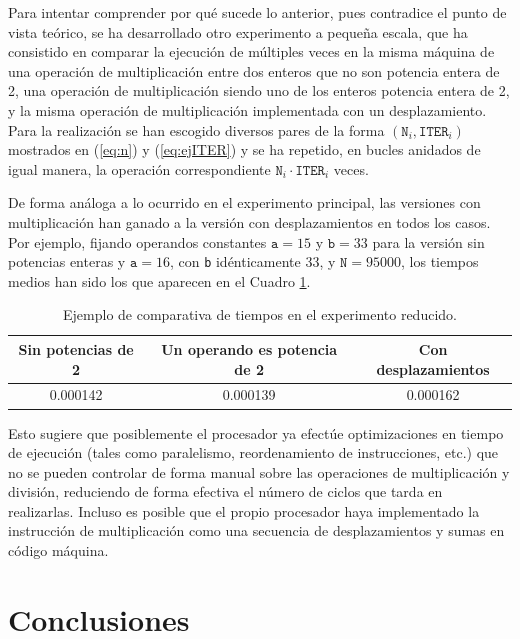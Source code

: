 \documentclass[11pt,a4paper,twoside]{article}
\theoremstyle{definition}
\begin{document}
	Para intentar comprender por qué sucede lo anterior, pues contradice el punto de vista teórico, se ha desarrollado otro experimento a pequeña escala, que ha consistido en comparar la ejecución de múltiples veces en la misma máquina de una operación de multiplicación entre dos enteros que no son potencia entera de 2, una operación de multiplicación siendo uno de los enteros potencia entera de 2, y la misma operación de multiplicación implementada con un desplazamiento. Para la realización se han escogido diversos pares de la forma $(\texttt{N}_i, \texttt{ITER}_i)$ mostrados en (\ref{eq:n}) y (\ref{eq:ejITER}) y se ha repetido, en bucles anidados de igual manera, la operación correspondiente $\texttt{N}_i\cdot \texttt{ITER}_i$ veces.
	
	De forma análoga a lo ocurrido en el experimento principal, las versiones con multiplicación han ganado a la versión con desplazamientos en todos los casos. Por ejemplo, fijando operandos constantes $\texttt{a}=15$ y $\texttt{b}=33$ para la versión sin potencias enteras y $\texttt{a}=16$, con \texttt{b} idénticamente 33, y $\texttt{N}=95000$, los tiempos medios han sido los que aparecen en el Cuadro \ref{tabla1}.
	
	\begin{table} [H] \centering
		\begin{tabular} {| c | c | c |}
			\hline
			\textbf{Sin potencias de 2} & \textbf{Un operando es potencia de 2} & \textbf{Con desplazamientos} \\
			\hline
			 0.000142 & 0.000139 & 0.000162 \\
			 \hline
		\end{tabular}
		\caption{Ejemplo de comparativa de tiempos en el experimento reducido.}
		\label{tabla1}
	\end{table} 
	
	Esto sugiere que posiblemente el procesador ya efectúe optimizaciones en tiempo de ejecución (tales como paralelismo, reordenamiento de instrucciones, etc.) que no se pueden controlar de forma manual sobre las operaciones de multiplicación y división, reduciendo de forma efectiva el número de ciclos que tarda en realizarlas. Incluso es posible que el propio procesador haya implementado la instrucción de multiplicación como una secuencia de desplazamientos y sumas en código máquina.
	
	\section{Conclusiones}
	
\end{document}
